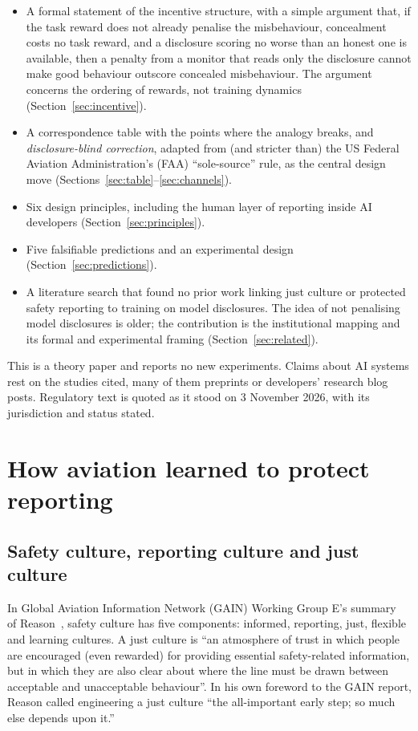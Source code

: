 \documentclass[review,12pt]{elsarticle}
\begin{document}
\begin{itemize}
\item A formal statement of the incentive structure, with a simple argument that, if the task reward does not already penalise the misbehaviour, concealment costs no task reward, and a disclosure scoring no worse than an honest one is available, then a penalty from a monitor that reads only the disclosure cannot make good behaviour outscore concealed misbehaviour. The argument concerns the ordering of rewards, not training dynamics (Section~\ref{sec:incentive}).
\item A correspondence table with the points where the analogy breaks, and \emph{disclosure-blind correction}, adapted from (and stricter than) the US Federal Aviation Administration's (FAA) ``sole-source'' rule, as the central design move (Sections~\ref{sec:table}--\ref{sec:channels}).
\item Six design principles, including the human layer of reporting inside AI developers (Section~\ref{sec:principles}).
\item Five falsifiable predictions and an experimental design (Section~\ref{sec:predictions}).
\item A literature search that found no prior work linking just culture or protected safety reporting to training on model disclosures. The idea of not penalising model disclosures is older; the contribution is the institutional mapping and its formal and experimental framing (Section~\ref{sec:related}).
\end{itemize}

This is a theory paper and reports no new experiments. Claims about AI systems rest on the studies cited, many of them preprints or developers' research blog posts. Regulatory text is quoted as it stood on 3 November 2026, with its jurisdiction and status stated.

\section{How aviation learned to protect reporting}\label{sec:aviation}

\subsection{Safety culture, reporting culture and just culture}\label{sec:culture}

In Global Aviation Information Network (GAIN) Working Group E's summary~\cite[Sec.~2.1 and Figure~1]{gain2004} of Reason~\cite{reason1997}, safety culture has five components: informed, reporting, just, flexible and learning cultures. A just culture is ``an atmosphere of trust in which people are encouraged (even rewarded) for providing essential safety-related information, but in which they are also clear about where the line must be drawn between acceptable and unacceptable behaviour''. In his own foreword to the GAIN report, Reason called engineering a just culture ``the all-important early step; so much else depends upon it.''
\end{document}

